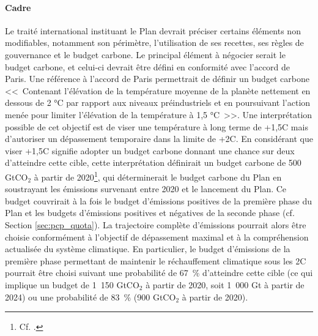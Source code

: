 \documentclass[a5paper,french,openany]{memoir}
\begin{document}
\paragraph{Cadre} %
Le traité international instituant le Plan devrait préciser certains éléments non modifiables, notamment son périmètre, l'utilisation de ses recettes, ses règles de gouvernance et le budget carbone. Le principal élément à négocier serait le budget carbone, et celui-ci devrait être défini en conformité avec l'accord de Paris. Une référence à l'accord de Paris permettrait de définir un budget carbone <<~Contenant l'élévation de la température moyenne de la planète nettement en dessous de 2 °C par rapport aux niveaux préindustriels et en poursuivant l'action menée pour limiter l'élévation de la température à 1,5 °C~>>. Une interprétation possible de cet objectif est de viser une température à long terme de +1,5\textdegree{}C mais d'autoriser un dépassement temporaire dans la limite de +2\textdegree{}C. 
En considérant que viser +1,5\textdegree{}C signifie adopter un budget carbone donnant une chance sur deux d'atteindre cette cible, cette interprétation définirait un budget carbone de 500 GtCO$_\text{2}$ à partir de 2020\footnote{Cf. \cite{ipcc_climate_2021}.}, 
qui déterminerait le budget carbone du Plan en soustrayant les émissions survenant entre 2020 et le lancement du Plan. Ce budget couvrirait à la fois le budget d'émissions positives de la première phase du Plan et les budgets d'émissions positives et négatives de la seconde phase (cf. Section \ref{sec:pcp_quota}). 
La trajectoire complète d'émissions %
pourrait alors être choisie conformément à l'objectif de dépassement maximal et à la compréhension actualisée du système climatique. 
En particulier, le budget d'émissions de la première phase permettant de maintenir le réchauffement climatique sous les 2\textdegree{}C pourrait être choisi suivant une probabilité de 67~\% d'atteindre cette cible (ce qui implique un budget de 1~150 GtCO$_\text{2}$ à partir de 2020, soit 1~000 Gt à partir de 2024) ou une probabilité de 83~\% (900 GtCO$_\text{2}$ à partir de 2020). 
\end{document}
